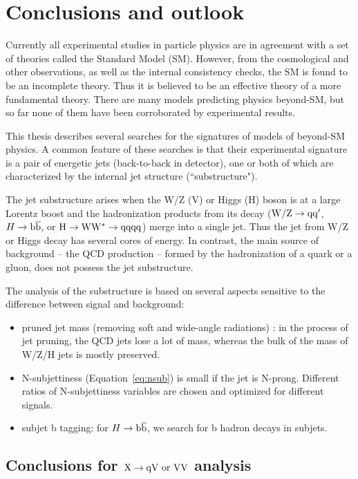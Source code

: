 \chapter{Conclusions and outlook}
\label{sec:conclusions1}


Currently all experimental studies in particle physics are in agreement with a set of theories called the Standard Model (SM).  
However, from the cosmological and other observations, as well as the internal consistency checks, the SM is found to be an incomplete theory. Thus it is believed to be an effective theory of a more fundamental theory. 
There are many models predicting physics beyond-SM, but so far none of them have been
corroborated by experimental results.

 This thesis describes several searches for the signatures of models of beyond-SM physics.  A common feature of these searches is that their experimental signature is a pair of energetic jets (back-to-back in detector), one or both of which are characterized by the internal jet structure (``substructure").

The jet substructure arises when the W/Z (V) or Higgs (H) boson is at a large Lorentz boost and the hadronization products from its decay 
(${\rm W/Z \to qq'}$, $H \to \mathrm{b\overline{b}}$, or ${\rm H \to WW^* \to qqqq}$) merge into a single jet. 
Thus the jet from W/Z or Higgs decay has several cores of energy. In contrast, the main source of background --  the QCD production -- formed by the hadronization of a quark or a gluon, does not possess the jet substructure.  
 

The analysis of the substructure is based on several aspects sensitive to the difference between signal and background:
\begin{itemize}
   \item pruned jet mass (removing soft and wide-angle radiations) : in the process of jet pruning, the QCD jets lose a lot of mass, 
   whereas the bulk of the mass of W/Z/H jets is mostly preserved. 
   \item N-subjettiness (Equation~\ref{eq:nsub}) is small if the jet is N-prong. Different ratios of N-subjettiness variables are chosen and optimized for different signals. 
   \item subjet b tagging:  for $H \to \mathrm{b\overline{b}}$, we search for b hadron decays in subjets. 

\end{itemize}
   


\section{Conclusions for ${\rm X \to qV~or~VV}$ analysis}

